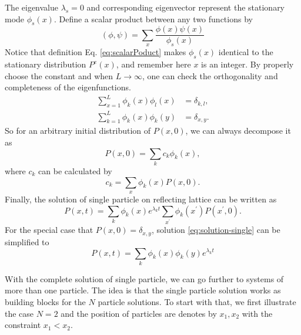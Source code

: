 The eigenvalue $\lambda_s = 0$ and corresponding eigenvector represent the stationary mode $\phi_s(x)$. Define a scalar product between any two functions by 
\begin{equation}
    \label{eq:scalarPoduct} (\phi, \psi) =
    \sum_{x}\frac{\phi(x)\psi(x)}{\phi_{s}(x)}
\end{equation}
Notice that definition Eq. \eqref{eq:scalarPoduct} makes $\phi_s(x)$ identical to the stationary distribution $P^e(x)$, and remember here $x$ is an integer. By properly choose the constant and when $L\rightarrow\infty$, one can check the orthogonality and completeness of the eigenfunctions.
\begin{subequations}
    \begin{align}
        \label{eq:orthogonality}
        \sum_{x=1}^L \phi_k(x)\phi_l(x) & = \delta_{k,l}, \\
        \label{eq:completeness}
        \sum_{k=1}^L \phi_k(x)\phi_k(y) & = \delta_{x,y}.
    \end{align}
\end{subequations}
So for an arbitrary initial distribution of $P(x, 0)$, we can always decompose it as 
\begin{equation}
    \label{eq:decompose-intial-single}
    P(x,0) = \sum_k{c_k \phi_k(x)},
\end{equation}
where $c_k$ can be calculated by 
\begin{equation}
    \label{eq:coeff-k}
    c_k = \sum_x{\phi_k(x) P(x,0)}.
\end{equation}
Finally, the solution of single particle on reflecting lattice can be written as
\begin{equation}
    \label{eq:solution-single}
    P(x,t) = \sum_k{\phi_k(x)e^{\lambda_k t}}\sum_{x^\prime}{\phi_k(x^\prime)P(x^\prime,0)}.
\end{equation}
For the special case that $P(x,0) = \delta_{x,y}$, solution \eqref{eq:solution-single} can be simplified to
\begin{equation}
    \label{eq:solution-single-simplified}
    P(x,t) = \sum_k{\phi_k(x)\phi_k(y)e^{\lambda_k t}}
\end{equation}

With the complete solution of single particle, we can go further to systems of more than one particle. The idea is that the single particle solution works as building blocks for the $N$ particle solutions. To start with that, we first illustrate the case $N=2$ and the position of particles are denotes by $x_1, x_2$ with the constraint $x_1<x_2$.

